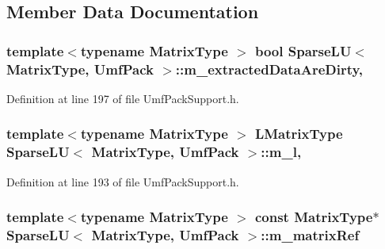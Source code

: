 \subsection{Member Data Documentation}
\hypertarget{class_sparse_l_u_3_01_matrix_type_00_01_umf_pack_01_4_ac5038610497e25cdbda03a44838b7a53}{
\subsubsection[{m\-\_\-extracted\-Data\-Are\-Dirty}]{\setlength{\rightskip}{0pt plus 5cm}template$<$typename Matrix\-Type $>$ bool {\bf Sparse\-L\-U}$<$ Matrix\-Type, {\bf Umf\-Pack} $>$\-::m\-\_\-extracted\-Data\-Are\-Dirty\hspace{0.3cm}{\ttfamily [mutable]}, {\ttfamily [protected]}}}\label{class_sparse_l_u_3_01_matrix_type_00_01_umf_pack_01_4_ac5038610497e25cdbda03a44838b7a53}


Definition at line 197 of file Umf\-Pack\-Support.\-h.

\hypertarget{class_sparse_l_u_3_01_matrix_type_00_01_umf_pack_01_4_a83b493c5fd33f69d053da81f15ef6a0e}{
\subsubsection[{m\-\_\-l}]{\setlength{\rightskip}{0pt plus 5cm}template$<$typename Matrix\-Type $>$ {\bf L\-Matrix\-Type} {\bf Sparse\-L\-U}$<$ Matrix\-Type, {\bf Umf\-Pack} $>$\-::m\-\_\-l\hspace{0.3cm}{\ttfamily [mutable]}, {\ttfamily [protected]}}}\label{class_sparse_l_u_3_01_matrix_type_00_01_umf_pack_01_4_a83b493c5fd33f69d053da81f15ef6a0e}


Definition at line 193 of file Umf\-Pack\-Support.\-h.

\hypertarget{class_sparse_l_u_3_01_matrix_type_00_01_umf_pack_01_4_ad8b2159b6faaba6aefca769598fa587b}{
\subsubsection[{m\-\_\-matrix\-Ref}]{\setlength{\rightskip}{0pt plus 5cm}template$<$typename Matrix\-Type $>$ const Matrix\-Type$\ast$ {\bf Sparse\-L\-U}$<$ Matrix\-Type, {\bf Umf\-Pack} $>$\-::m\-\_\-matrix\-Ref\hspace{0.3cm}{\ttfamily [protected]}}}\label{class_sparse_l_u_3_01_matrix_type_00_01_umf_pack_01_4_ad8b2159b6faaba6aefca769598fa587b}


